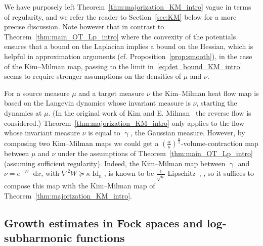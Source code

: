 \documentclass[AHL,Unicode,longabstracts]{cedram}
\DeclareMathOperator{\Id}{Id}
\newcommand{\W}{W}
\newcommand{\dd}{n}
\newcommand{\source}{\mu}
\newcommand{\target}{\nu}
\newcommand{\lsh}{\alpha}
\newcommand{\lc}{\kappa}
\newcommand*\diff{\mathop{}\!\mathrm{d}}
\newcommand{\Gaussian}{\upgamma}
\begin{document}
We have purposely left Theorem~\ref{thm:majorization_KM_intro} vague in terms of regularity, and we refer the reader to Section~\ref{sec:KM} below for a more precise discussion. Note however that in contrast to Theorem~\ref{thm:main_OT_Lp_intro} where the convexity of the potentials ensures that a bound on the Laplacian implies a bound on the Hessian, which is helpful in approximation arguments (cf. Proposition~\ref{prop:smooth}), in the case of the Kim--Milman map, passing to the limit in~\eqref{eq:det_bound_KM_intro} seems to require stronger assumptions on the densities of $\source$ and $\target$.



\begin{rema}\label{rem:compose}
For a source measure $\source$ and a target measure $\target$ the Kim--Milman heat flow map is based on the Langevin dynamics whose invariant measure is $\target$, starting the dynamics at $\source$. (In the original work of Kim and E. Milman~\cite{MR2983070} the reverse flow is considered.) Theorem~\ref{thm:majorization_KM_intro} only applies to the flow whose invariant measure $\target$ is equal to $\Gaussian$, the Gaussian measure. However, by composing two Kim--Milman maps we could get a $(\frac{\lsh}{\lc})^{\frac{\dd}{2}}$-volume-contraction map between $\source$ and $\target$ under the assumptions of Theorem~\ref{thm:main_OT_Lp_intro} (assuming sufficient regularity). Indeed, the Kim--Milman map between $\Gaussian$ and $\target=e^{-W}\diff x$, with $\nabla^2\W \succeq \lc \Id_{\dd}$, is known to be $\frac{1}{\sqrt{\lc}}$-Lipschitz~\cite[Theorem~1.1]{MR2983070}, \cite[Theorem~1]{MS2022}, so it suffices to compose this map with the Kim--Milman map of Theorem~\ref{thm:majorization_KM_intro}.
\end{rema}



\subsection{Growth estimates in Fock spaces and log-subharmonic functions}
\end{document}
